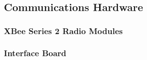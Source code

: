 
\subsection{Communications Hardware}


\subsubsection{XBee Series 2 Radio Modules}


\subsubsection{Interface Board}

